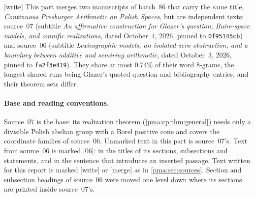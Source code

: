 \documentclass[11pt]{article}
\numberwithin{equation}{section}
\theoremstyle{definition}
\theoremstyle{remark}
\newcommand{\src}[1]{\textup{\textsf{\small[#1]}}}
\newcommand{\mergetag}{\textup{\textsf{\small[merge]}}}
\newcommand{\writetag}{\textup{\textsf{\small[write]}}}
\begin{document}
\noindent\writetag{} This part merges two manuscripts of batch~86 that carry
the same title, \emph{Continuous Presburger Arithmetic on Polish Spaces}, but
are independent texts: source~07 (subtitle \emph{An affirmative construction
for Glazer's question, Baire-space models, and omnific realizations}, dated
October~4, 2026, pinned to \texttt{0f95145cb}) and source~06 (subtitle
\emph{Lexicographic models, an isolated-zero obstruction, and a boundary
between additive and semiring arithmetic}, dated October~3, 2026, pinned to
\texttt{fa2f3e419}). They share at most 0.74\% of their word 8-grams, the
longest shared runs being Glazer's quoted question and bibliography entries,
and their theorem sets differ.

\paragraph{Base and reading conventions.} Source~07 is the base: its
realization theorem (\cref{pma:cp:thm:general}) needs only a divisible Polish
abelian group with a Borel positive cone and covers the coordinate families
of source~06. Unmarked text in this part is source~07's. Text from source~06
is marked \src{06}: in the titles of its sections, subsections and
statements, and in the sentence that introduces an inserted passage. Text
written for this report is marked \writetag{} or \mergetag{} as in
\cref{pma:sec:sources}. Section and subsection headings of source~06 were
moved one level down where its sections are printed inside source~07's.
\end{document}
